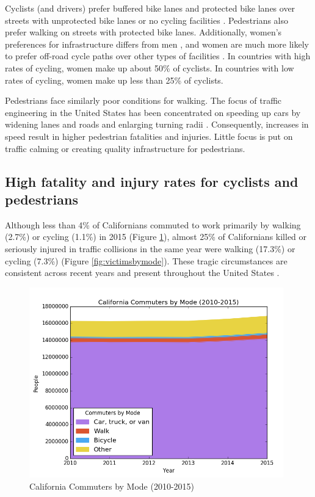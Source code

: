 \documentclass{article}
\begin{document}
Cyclists (and drivers) prefer buffered bike lanes and protected bike lanes over streets with unprotected bike lanes or no cycling facilities \citep[Page 6]{monsere2012} \citep[Page 10]{mcneil2015}. Pedestrians also prefer walking on streets with protected bike lanes. Additionally, women's preferences for infrastructure differs from men \citep[Page 2174]{pedroso2016}, and women are much more likely to prefer off-road cycle paths over other types of facilities \citep[Page 5]{monsere2012} \citep[Page 57]{garrard2008}. In countries with high rates of cycling, women make up about 50\% of cyclists. In countries with low rates of cycling, women make up less than 25\% of cyclists.

Pedestrians face similarly poor conditions for walking. The focus of traffic engineering in the United States has been concentrated on speeding up cars by widening lanes and roads and enlarging turning radii \citep[Page 14]{mccann2000}. Consequently, increases in speed result in higher pedestrian fatalities and injuries. Little focus is put on traffic calming or creating quality infrastructure for pedestrians.

\subsection*{High fatality and injury rates for cyclists and pedestrians}
Although less than 4\% of Californians commuted to work primarily by walking (2.7\%) or cycling (1.1\%) in 2015 \citep{uscb2016} (Figure \ref{fig:commutersbymode}), almost 25\% of Californians killed or seriously injured in traffic collisions in the same year were walking (17.3\%) or cycling (7.3\%) \citep{chp} (Figure \ref{fig:victimsbymode}). These tragic circumstances are consistent across recent years and present throughout the United States \citep{nhtsa}.

\begin{figure}[p]
    \centering
    \includegraphics[width=11cm]{commutersbymode}
    \caption{California Commuters by Mode (2010-2015)}
    \label{fig:commutersbymode}
\end{figure}
\end{document}
